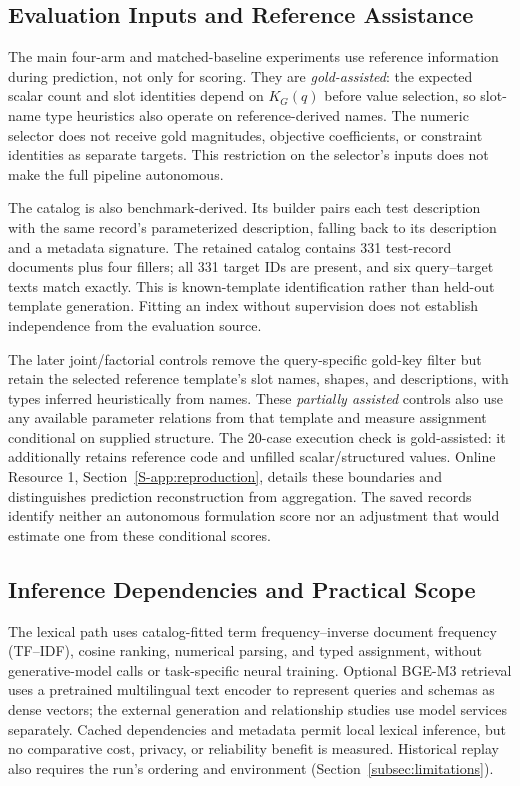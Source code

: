 \documentclass[pdflatex,iicol,sn-basic,Numbered]{sn-jnl}
\begin{document}
\subsection{Evaluation Inputs and Reference Assistance}
\label{subsec:assistance-setting}

The main four-arm and matched-baseline experiments use reference information during prediction, not only for scoring. They are \emph{gold-assisted}: the expected scalar count and slot identities depend on $K_G(q)$ before value selection, so slot-name type heuristics also operate on reference-derived names. The numeric selector does not receive gold magnitudes, objective coefficients, or constraint identities as separate targets. This restriction on the selector's inputs does not make the full pipeline autonomous.

The catalog is also benchmark-derived. Its builder pairs each test description with the same record's parameterized description, falling back to its description and a metadata signature. The retained catalog contains 331 test-record documents plus four fillers; all 331 target IDs are present, and six query--target texts match exactly. This is known-template identification rather than held-out template generation. Fitting an index without supervision does not establish independence from the evaluation source.

The later joint/factorial controls remove the query-specific gold-key filter but retain the selected reference template's slot names, shapes, and descriptions, with types inferred heuristically from names. These \emph{partially assisted} controls also use any available parameter relations from that template and measure assignment conditional on supplied structure. The 20-case execution check is gold-assisted: it additionally retains reference code and unfilled scalar/structured values. Online Resource 1, Section~\ref{S-app:reproduction}, details these boundaries and distinguishes prediction reconstruction from aggregation. The saved records identify neither an autonomous formulation score nor an adjustment that would estimate one from these conditional scores.

\subsection{Inference Dependencies and Practical Scope}
\label{subsec:inference-dependencies}
The lexical path uses catalog-fitted term frequency--inverse document frequency (TF--IDF), cosine ranking, numerical parsing, and typed assignment, without generative-model calls or task-specific neural training. Optional BGE-M3 retrieval uses a pretrained multilingual text encoder to represent queries and schemas as dense vectors; the external generation and relationship studies use model services separately. Cached dependencies and metadata permit local lexical inference, but no comparative cost, privacy, or reliability benefit is measured. Historical replay also requires the run's ordering and environment (Section~\ref{subsec:limitations}).
\end{document}
